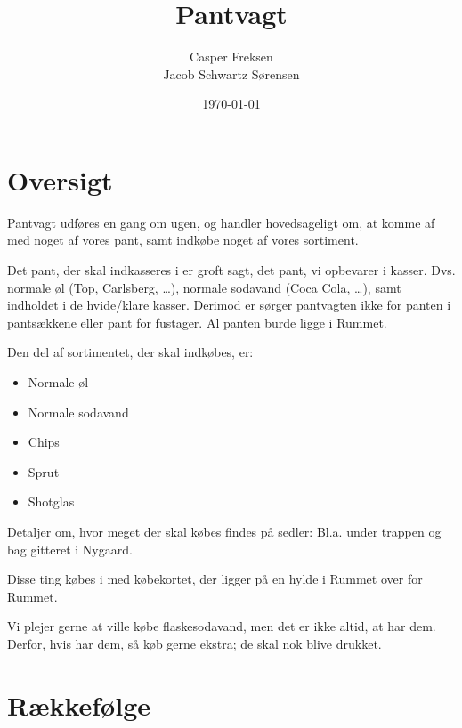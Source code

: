 

\title{Pantvagt}
\date{\today}
\author{Casper Freksen\\
Jacob Schwartz Sørensen}



\newcommand{\shoppingcartloc}{rummet ved siden af rummet}

\maketitle

\section{Oversigt}
\label{sec:oversigt}

Pantvagt udføres en gang om ugen, og handler hovedsageligt om, at
komme af med noget af vores pant, samt indkøbe noget af vores
sortiment.

Det pant, der skal indkasseres i \fotex er groft sagt, det pant, vi
opbevarer i kasser. Dvs. normale øl (Top, Carlsberg, \dots), normale
sodavand (Coca Cola, \dots), samt indholdet i de hvide/klare
kasser. Derimod er sørger pantvagten ikke for panten i pantsækkene
eller pant for fustager. Al panten burde ligge i Rummet.

Den del af sortimentet, der skal indkøbes, er:
\begin{itemize}
\item Normale øl
\item Normale sodavand
\item Chips
\item Sprut
\item Shotglas
\end{itemize}
Detaljer om, hvor meget der skal købes findes på sedler: Bl.a. under
trappen og bag gitteret i Nygaard.

Disse ting købes i \fotex med købekortet, der ligger på en hylde i
Rummet over for Rummet.

Vi plejer gerne at ville købe flaskesodavand, men det er ikke altid,
at \fotex har dem. Derfor, hvis \fotex har dem, så køb gerne ekstra; de
skal nok blive drukket.

\section{Rækkefølge}
\label{sec:rakkefolge}

